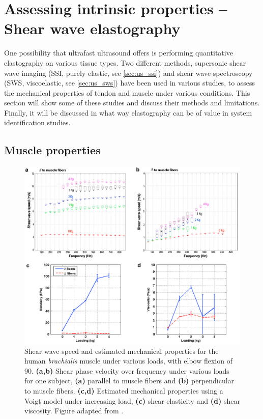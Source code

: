 \section{Assessing intrinsic properties -- Shear wave elastography}
One possibility that ultrafast ultrasound offers is performing quantitative elastography on various tissue types. Two different methods, supersonic shear wave imaging (SSI, purely elastic, see \autoref{sec:us_ssi}) and shear wave spectroscopy (SWS, viscoelastic, see \ref{sec:us_sws}) have been used in various studies, to assess the mechanical properties of tendon and muscle under various conditions. This section will show some of these studies and discuss their methods and limitations. Finally, it will be discussed in what way elastography can be of value in system identification studies. 



\subsection{Muscle properties}

\begin{figure}[t]
	\centering
	\includegraphics[width=.90\linewidth]{Figures/elastography/gennisson_dispersion2.png}
	\caption{Shear wave speed and estimated mechanical properties for the human \textit{brachialis} muscle under various loads, with elbow flexion of \SI{90}{\deg}. \textbf{(a,b)} Shear phase velocity over frequency under various loads for one subject, \textbf{(a)} parallel to muscle fibers and \textbf{(b)} perpendicular to muscle fibers. \textbf{(c,d)} Estimated mechanical properties using a Voigt model under increasing load, \textbf{(c)} shear elasticity and \textbf{(d)} shear viscosity. Figure adapted from \citet{gennisson_viscoelastic_2010}.}
	\label{fig:rem_gennisson_dispersion_force}
\end{figure}


